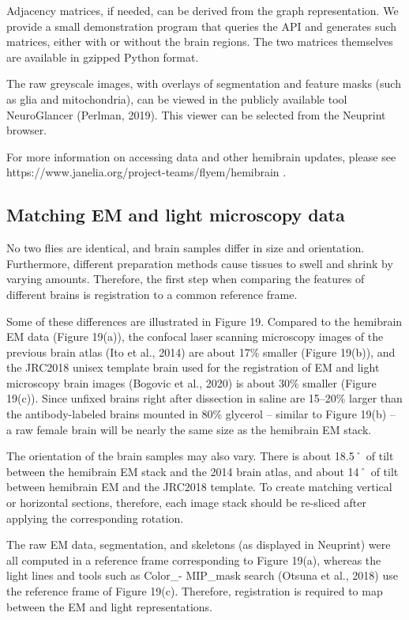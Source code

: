 \documentclass{article}
\begin{document}
Adjacency matrices, if needed, can be derived from the graph representation. We provide a small demonstration program that queries the API and generates such matrices, either with or without the brain regions. The two matrices themselves are available in gzipped Python format.

The raw greyscale images, with overlays of segmentation and feature masks (such as glia and mitochondria), can be viewed in the publicly available tool NeuroGlancer (Perlman, 2019). This viewer can be selected from the Neuprint browser.

For more information on accessing data and other hemibrain updates, please see https://www.janelia.org/project-teams/flyem/hemibrain .

\subsection*{Matching EM and light microscopy data}

No two flies are identical, and brain samples differ in size and orientation. Furthermore, different preparation methods cause tissues to swell and shrink by varying amounts. Therefore, the first step when comparing the features of different brains is registration to a common reference frame.

Some of these differences are illustrated in Figure 19. Compared to the hemibrain EM data (Figure 19(a)), the confocal laser scanning microscopy images of the previous brain atlas (Ito et al., 2014) are about 17\% smaller (Figure 19(b)), and the JRC2018 unisex template brain used for the registration of EM and light microscopy brain images (Bogovic et al., 2020) is about 30\% smaller (Figure 19(c)). Since unfixed brains right after dissection in saline are 15–20\% larger than the antibody-labeled brains mounted in 80\% glycerol – similar to Figure 19(b) – a raw female brain will be nearly the same size as the hemibrain EM stack.

The orientation of the brain samples may also vary. There is about 18.5˚ of tilt between the hemibrain EM stack and the 2014 brain atlas, and about 14˚ of tilt between hemibrain EM and the JRC2018 template. To create matching vertical or horizontal sections, therefore, each image stack should be re-sliced after applying the corresponding rotation.


The raw EM data, segmentation, and skeletons (as displayed in Neuprint) were all computed in a reference frame corresponding to Figure 19(a), whereas the light lines and tools such as Color\_- MIP\_mask search (Otsuna et al., 2018) use the reference frame of Figure 19(c). Therefore, registration is required to map between the EM and light representations.
\end{document}
